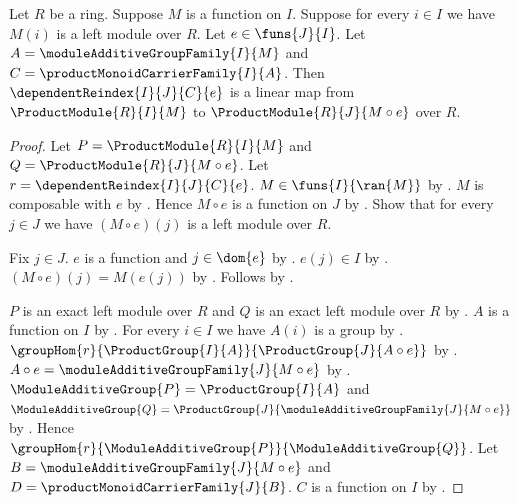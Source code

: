 \begin{theorem}\label{product_module_reindex_linear}
    Let $R$ be a ring.
    Suppose $M$ is a function on $I$.
    Suppose for every $i\in I$ we have $M(i)$ is a left module over $R$.
    Let $e\in\funs{J}{I}$.
    Let $A=\moduleAdditiveGroupFamily{I}{M}$ and
        $C=\productMonoidCarrierFamily{I}{A}$.
    Then $\dependentReindex{I}{J}{C}{e}$ is a linear map from
        $\ProductModule{R}{I}{M}$ to
        $\ProductModule{R}{J}{M\circ e}$ over $R$.
\end{theorem}
\begin{proof}
    Let $P=\ProductModule{R}{I}{M}$ and
        $Q=\ProductModule{R}{J}{M\circ e}$.
    Let $r=\dependentReindex{I}{J}{C}{e}$.
    $M\in\funs{I}{\ran{M}}$ by
        .
    $M$ is composable with $e$ by .
    Hence $M\circ e$ is a function on $J$ by
        .
    Show that for every $j\in J$ we have
        $(M\circ e)(j)$ is a left module over $R$.
    \begin{subproof}
        Fix $j\in J$.
        $e$ is a function and $j\in\dom{e}$ by
            .
        $e(j)\in I$ by .
        $(M\circ e)(j)=M(e(j))$ by
            .
        Follows by \auto.
    \end{subproof}
    $P$ is an exact left module over $R$ and
        $Q$ is an exact left module over $R$ by
        .
    $A$ is a function on $I$ by
        .
    For every $i\in I$ we have $A(i)$ is a group by
        .
    $\groupHom{r}{\ProductGroup{I}{A}}{
        \ProductGroup{J}{A\circ e}}$ by
        .
    $A\circ e=\moduleAdditiveGroupFamily{J}{M\circ e}$ by
        .
    $\ModuleAdditiveGroup{P}=\ProductGroup{I}{A}$ and
        $\ModuleAdditiveGroup{Q}
            =\ProductGroup{J}{\moduleAdditiveGroupFamily{J}{M\circ e}}$
        by .
    Hence $\groupHom{r}{\ModuleAdditiveGroup{P}}{
        \ModuleAdditiveGroup{Q}}$.
    Let $B=\moduleAdditiveGroupFamily{J}{M\circ e}$ and
        $D=\productMonoidCarrierFamily{J}{B}$.
    $C$ is a function on $I$ by
        .

\end{proof}
